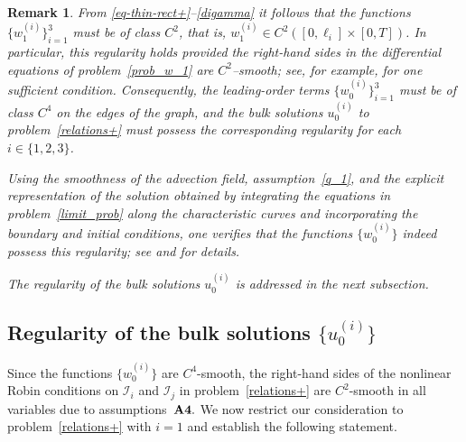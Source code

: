 \documentclass[reqno]{amsart}            %
\newtheorem{remark}{Remark}[section]
\numberwithin{equation}{section}
\begin{document}
	\begin{remark}\label{rem-2-2}
		From \eqref{eq-thin-rect+}–\eqref{digamma} it follows that the functions
		$\{w^{(i)}_1\}_{i=1}^3$ must be of class $C^2$, that is,
		$w^{(i)}_1\in C^2([0,\ell_i]\times[0,T])$.  
		In particular, this regularity holds provided the right-hand sides in the
		differential equations of problem~\eqref{prob_w_1} are $C^2$–smooth; see, for
		example, \cite[Th.~5.4]{Friedrichs-1948} for one sufficient condition.  
		Consequently, the leading-order terms $\{w^{(i)}_0\}_{i=1}^3$ must be of class
		$C^4$ on the edges of the graph, and the bulk solutions $u^{(i)}_0$ to
		problem~\eqref{relations+} must possess the corresponding regularity for each
		$i\in\{1,2,3\}$.
		
		Using the smoothness of the advection field, assumption~\eqref{q_1}, and the
		explicit representation of the solution obtained by integrating the equations in
		problem~\eqref{limit_prob} along the characteristic curves and incorporating the
		boundary and initial conditions, one verifies that the functions $\{w^{(i)}_0\}$
		indeed possess this regularity; see \cite[\S 3.2.1]{Mel-Roh_AA-2024} and
		\cite[\S 3.3]{Mel-Roh_JMAA-2024} for details.
		
		The regularity of the bulk solutions $u^{(i)}_0$ is addressed in the next
		subsection.
	\end{remark}
	
	\subsection{Regularity of the bulk solutions $\{u_0^{(i)}\}$}
	Since the functions $\{w^{(i)}_0\}$ are $C^4$-smooth,  the right-hand sides
	of the nonlinear Robin conditions on $\mathcal{I}_i$ and $\mathcal{I}_j$ in
	problem~\eqref{relations+} are $C^2$-smooth in all variables due to  assumptions~${\bf A4}.$
	We now restrict our consideration to problem~\eqref{relations+} with $i=1$ and establish the following statement.
	
\end{document}
